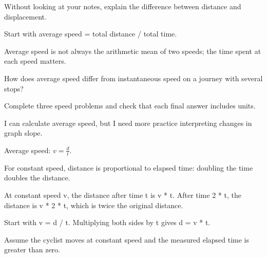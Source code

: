 \documentclass[11pt]{article}
\begin{document}
\begin{recallbox}
Without looking at your notes, explain the difference between distance and displacement.
\end{recallbox}

\begin{hintbox}
Start with average speed = total distance / total time.
\end{hintbox}

\begin{misconceptionbox}
Average speed is not always the arithmetic mean of two speeds; the time spent at each speed matters.
\end{misconceptionbox}

\begin{askbox}
How does average speed differ from instantaneous speed on a journey with several stops?
\end{askbox}

\begin{actionbox}
Complete three speed problems and check that each final answer includes units.
\end{actionbox}

\begin{reflectionbox}
I can calculate average speed, but I need more practice interpreting changes in graph slope.
\end{reflectionbox}

\begin{formulabox}
Average speed: \(v = \frac{d}{t}\).
\end{formulabox}

\begin{theorembox}
For constant speed, distance is proportional to elapsed time: doubling the time doubles the distance.
\end{theorembox}

\begin{proofbox}
At constant speed v, the distance after time t is v * t. After time 2 * t, the distance is v * 2 * t, which is twice the original distance.
\end{proofbox}

\begin{derivationbox}
Start with v = d / t. Multiplying both sides by t gives d = v * t.
\end{derivationbox}

\begin{assumptionbox}
Assume the cyclist moves at constant speed and the measured elapsed time is greater than zero.
\end{assumptionbox}
\end{document}
